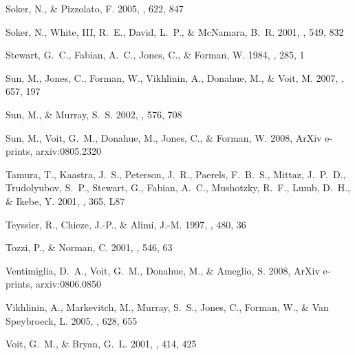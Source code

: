 \documentclass[12pt,preprint]{aastex}
\begin{document}
\begin{thebibliography}{138}
{Soker}, N., \& {Pizzolato}, F. 2005, \apj, 622, 847

{Soker}, N., {White}, III, R.~E., {David}, L.~P., \& {McNamara}, B.~R. 2001,
  \apj, 549, 832

{Stewart}, G.~C., {Fabian}, A.~C., {Jones}, C., \& {Forman}, W. 1984, \apj,
  285, 1

{Sun}, M., {Jones}, C., {Forman}, W., {Vikhlinin}, A., {Donahue}, M., \&
  {Voit}, M. 2007, \apj, 657, 197

{Sun}, M., \& {Murray}, S.~S. 2002, \apj, 576, 708

{Sun}, M., {Voit}, G.~M., {Donahue}, M., {Jones}, C., \& {Forman}, W. 2008,
  ArXiv e-prints, arxiv:0805.2320

{Tamura}, T., {Kaastra}, J.~S., {Peterson}, J.~R., {Paerels}, F.~B.~S.,
  {Mittaz}, J.~P.~D., {Trudolyubov}, S.~P., {Stewart}, G., {Fabian}, A.~C.,
  {Mushotzky}, R.~F., {Lumb}, D.~H., \& {Ikebe}, Y. 2001, \aap, 365, L87

{Teyssier}, R., {Chieze}, J.-P., \& {Alimi}, J.-M. 1997, \apj, 480, 36

{Tozzi}, P., \& {Norman}, C. 2001, \apj, 546, 63

{Ventimiglia}, D.~A., {Voit}, G.~M., {Donahue}, M., \& {Ameglio}, S. 2008,
  ArXiv e-prints, arxiv:0806.0850

{Vikhlinin}, A., {Markevitch}, M., {Murray}, S.~S., {Jones}, C., {Forman}, W.,
  \& {Van Speybroeck}, L. 2005, \apj, 628, 655

{Voit}, G.~M., \& {Bryan}, G.~L. 2001, \nat, 414, 425


\end{thebibliography}
\end{document}
